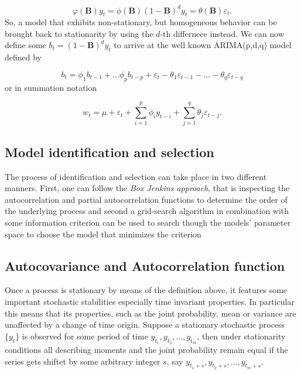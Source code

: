 \begin{equation}
        \varphi(\boldsymbol{B}) y_{t}=\phi(\boldsymbol{B})(1-\boldsymbol{B})^{d} y_{t}=\theta(\boldsymbol{B}) \varepsilon_{t}.
\end{equation}
%
So, a model that exhibits non-stationary, but homogeneous behavior can be brought back to stationarity by using the $d$-th differnece instead. We can now define some $b_{t}=(1-\boldsymbol{B})^{d} y_{t}$ to arrive at the well known ARIMA(p,d,q) model defined by 

\begin{equation}
        b_{t}=\phi_{1} b_{t-1}+\dots \phi_{p} b_{t-p}+\varepsilon_{t}-\theta_{1} \varepsilon_{t-1}-\dots-\theta_{q} \varepsilon_{t-q}
\end{equation}
%
or in summation notation

\begin{equation}
        w_{t}=\mu+\varepsilon_{t}+\sum_{i=1}^{p} \phi_{i} y_{t-i}+\sum_{j=1}^{q} \theta_{j} \varepsilon_{t-j}.
\end{equation}

\subsection{Model identification and selection}

The process of identification and selection can take place in two different manners. First, one can follow the \textit{Box Jenkins approach}, that is inspecting the autocorrelation and partial autocorrelation functions to determine the order of the underlying process and second a grid-search algorithm in combination with some information criterion can be used to search though the models' parameter space to choose the model that minimizes the criterion

\subsection*{Autocovariance and Autocorrelation function}

Once a process is stationary by means of the definition above, it features some important stochastic stabilities especially time invariant properties. In particular this means that its properties, such as the joint probability, mean or variance are unaffected by a change of time origin. Suppose a stationary stochastic process $\{y_t\}$ is observed for some period of time $y_{t_1}, y_{t_2},\dots,y_{t_m}$, then under stationarity conditions all describing moments and the joint probability remain equal if the series gets shiftet by some arbitrary integer $s$, say $y_{t_1+s}, y_{t_2+s},\dots,y_{t_m+s}$.

